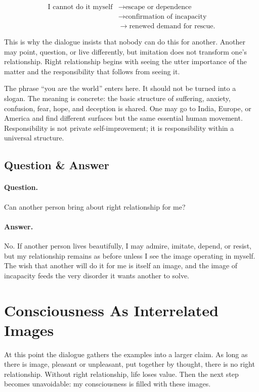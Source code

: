 \begin{align}
\text{I cannot do it myself}
&\longrightarrow \text{escape or dependence} \\
&\longrightarrow \text{confirmation of incapacity} \\
&\longrightarrow \text{renewed demand for rescue}.
\end{align}

This is why the dialogue insists that nobody can do this for another. Another may point, question, or live differently, but imitation does not transform one's relationship. Right relationship begins with seeing the utter importance of the matter and the responsibility that follows from seeing it.

The phrase ``you are the world'' enters here. It should not be turned into a slogan. The meaning is concrete: the basic structure of suffering, anxiety, confusion, fear, hope, and deception is shared. One may go to India, Europe, or America and find different surfaces but the same essential human movement. Responsibility is not private self-improvement; it is responsibility within a universal structure.

\subsection{Question \& Answer}

\paragraph{Question.}
Can another person bring about right relationship for me?

\paragraph{Answer.}
No. If another person lives beautifully, I may admire, imitate, depend, or resist, but my relationship remains as before unless I see the image operating in myself. The wish that another will do it for me is itself an image, and the image of incapacity feeds the very disorder it wants another to solve.

\section{Consciousness As Interrelated Images}

At this point the dialogue gathers the examples into a larger claim. As long as there is image, pleasant or unpleasant, put together by thought, there is no right relationship. Without right relationship, life loses value. Then the next step becomes unavoidable: my consciousness is filled with these images.

